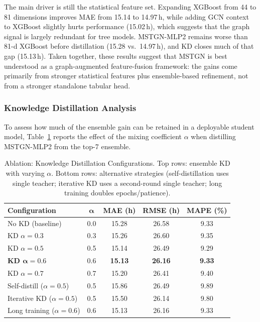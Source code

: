 \documentclass[conference]{IEEEtran}
\begin{document}
The main driver is still the statistical feature set. Expanding XGBoost from 44 to 81 dimensions improves MAE from 15.14 to 14.97\,h, while adding GCN context to XGBoost slightly hurts performance (15.02\,h), which suggests that the graph signal is largely redundant for tree models. MSTGN-MLP2 remains worse than 81-d XGBoost before distillation (15.28 vs.\ 14.97\,h), and KD closes much of that gap (15.13\,h). Taken together, these results suggest that MSTGN is best understood as a graph-augmented feature-fusion framework: the gains come primarily from stronger statistical features plus ensemble-based refinement, not from a stronger standalone tabular head.

\subsubsection{Knowledge Distillation Analysis}
\label{sec:kd_ablation}

To assess how much of the ensemble gain can be retained in a deployable student model, Table~\ref{tab:kd_ablation} reports the effect of the mixing coefficient $\alpha$ when distilling MSTGN-MLP2 from the top-7 ensemble.

\begin{table}[t]
    \centering
    \caption{Ablation: Knowledge Distillation Configurations. Top rows: ensemble KD with varying $\alpha$. Bottom rows: alternative strategies (self-distillation uses single teacher; iterative KD uses a second-round single teacher; long training doubles epochs/patience).}
    \label{tab:kd_ablation}
    \begin{tabular}{lcccc}
        \toprule
        \textbf{Configuration} & $\boldsymbol{\alpha}$ & \textbf{MAE (h)} & \textbf{RMSE (h)} & \textbf{MAPE (\%)} \\
        \midrule
        No KD (baseline)  & 0.0 & 15.28 & 26.58 & 9.33 \\
        KD $\alpha{=}0.3$ & 0.3 & 15.26 & 26.60 & 9.35 \\
        KD $\alpha{=}0.5$ & 0.5 & 15.14 & 26.49 & 9.29 \\
        \textbf{KD $\boldsymbol{\alpha{=}0.6}$} & 0.6 & \textbf{15.13} & \textbf{26.16} & \textbf{9.33} \\
        KD $\alpha{=}0.7$ & 0.7 & 15.20 & 26.41 & 9.40 \\
        \midrule
        Self-distill ($\alpha{=}0.5$) & 0.5 & 15.86 & 26.49 & 9.89 \\
        Iterative KD ($\alpha{=}0.5$) & 0.5 & 15.50 & 26.14 & 9.80 \\
        Long training ($\alpha{=}0.6$) & 0.6 & 15.13 & 26.16 & 9.33 \\
        \bottomrule
    \end{tabular}
\end{table}
\end{document}
